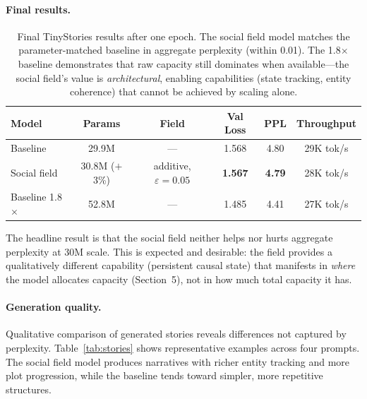 \documentclass[11pt,a4paper]{article}
\begin{document}
\paragraph{Final results.}

\begin{table}[h]
\centering
\begin{tabular}{@{}lccccc@{}}
\toprule
\textbf{Model} & \textbf{Params} & \textbf{Field} &
\textbf{Val Loss} & \textbf{PPL} & \textbf{Throughput} \\
\midrule
Baseline & 29.9M & --- & 1.568 & 4.80 & 29K tok/s \\
Social field & 30.8M ($+$3\%) & additive, $\varepsilon\!=\!0.05$ &
\textbf{1.567} & \textbf{4.79} & 28K tok/s \\
Baseline 1.8$\times$ & 52.8M & --- & 1.485 & 4.41 & 27K tok/s \\
\bottomrule
\end{tabular}
\caption{Final TinyStories results after one epoch.  The social field
model matches the parameter-matched baseline in aggregate perplexity
(within 0.01).  The 1.8$\times$ baseline demonstrates that raw capacity
still dominates when available---the social field's value is
\emph{architectural}, enabling capabilities (state tracking, entity
coherence) that cannot be achieved by scaling alone.}
\label{tab:tinystories_final}
\end{table}

The headline result is that the social field neither helps nor hurts
aggregate perplexity at 30M scale.  This is expected and desirable:
the field provides a qualitatively different capability (persistent
causal state) that manifests in \emph{where} the model allocates
capacity (Section~5), not in how much total capacity it has.

\paragraph{Generation quality.}
Qualitative comparison of generated stories reveals differences not
captured by perplexity.  Table~\ref{tab:stories} shows representative
examples across four prompts.  The social field model produces
narratives with richer entity tracking and more plot progression,
while the baseline tends toward simpler, more repetitive structures.
\end{document}
